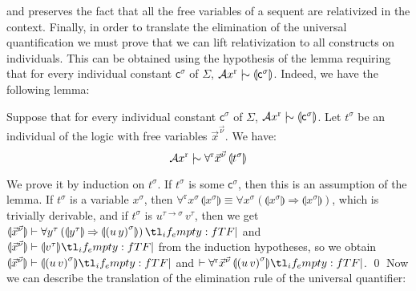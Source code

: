 \documentclass{CSML}
\newcommand*\ifpresent[3]{\tl_if_empty:fTF{#1}{#3}{#2}}
\newcommand*\Entails{\mathrel{\vdash}}
\newcommand*\Derives{\mathrel{|\mkern-8.75mu\sim}}
\newcommand*\BarSep{\mathrel{|}}
\newcommand*\Sequent[3]{#1\Entails#2\ifpresent{#3}{\BarSep}{}#3}
\newcommand*\SortTo\to
\newcommand*\SortA{\sigma}
\newcommand*\SortB{\tau}
\newcommand*\SortC{\nu}
\newcommand*\LogSortedTerm[2]{#1^{#2}}
\newcommand*\LogTermA{t}
\newcommand*\LogTermB{u}
\newcommand*\LogTermC{v}
\newcommand*\LogVarA{x}
\newcommand*\LogVarB{y}
\newcommand*\LogConst[1]{\mathsf{#1}}
\newcommand*\LogConstA{\LogConst{c}}
\newcommand*\LogImp{\mathbin{\Rightarrow}}
\newcommand*\LogRel[1]{\llparenthesis#1\rrparenthesis}
\newcommand*\LogRelForm[1]{{#1^\mathrm{r}}}
\newcommand*\LogForallRel{\forall^\mathrm{r}}
\newcommand*\LogAxioms{\mathcal{A}x}
\begin{document}
and preserves the fact that all the free variables of a sequent are relativized in the context. Finally, in order to translate the elimination of the universal quantification we must prove that we can lift relativization to all constructs on individuals. This can be obtained using the hypothesis of the lemma requiring that for every individual constant $\LogSortedTerm{\LogConstA}{\SortA}$ of $\Sigma$, $\LogRelForm{\LogAxioms}\Derives\LogRel{\LogSortedTerm{\LogConstA}{\SortA}}$. Indeed, we have the following lemma:
\begin{lem}
\label{relindiv}
Suppose that for every individual constant $\LogSortedTerm{\LogConstA}{\SortA}$ of $\Sigma$, $\LogRelForm{\LogAxioms}\Derives\LogRel{\LogSortedTerm{\LogConstA}{\SortA}}$. Let $\LogSortedTerm{\LogTermA}{\SortA}$ be an individual of the logic with free variables $\LogSortedTerm{\vec{\LogVarA}}{\vec{\SortC}}$. We have:
$$\LogRelForm{\LogAxioms}\Derives\LogForallRel\LogSortedTerm{\vec{\LogVarA}}{\vec{\SortC}}\,\LogRel{\LogSortedTerm{\LogTermA}{\SortA}}$$
\end{lem}
\proof
We prove it by induction on $\LogSortedTerm{\LogTermA}{\SortA}$. If $\LogSortedTerm{\LogTermA}{\SortA}$ is some $\LogSortedTerm{\LogConstA}{\SortA}$, then this is an assumption of the lemma. If $\LogSortedTerm{\LogTermA}{\SortA}$ is a variable $\LogSortedTerm{\LogVarA}{\SortA}$, then $\LogForallRel\LogSortedTerm{\LogVarA}{\SortA}\,\LogRel{\LogSortedTerm{\LogVarA}{\SortA}}\equiv\forall\LogSortedTerm{\LogVarA}{\SortA}\left(\LogRel{\LogSortedTerm{\LogVarA}{\SortA}}\LogImp\LogRel{\LogSortedTerm{\LogVarA}{\SortA}}\right)$, which is trivially derivable, and if $\LogSortedTerm{\LogTermA}{\SortA}$ is $\LogSortedTerm{\LogTermB}{\SortB\SortTo\SortA}\,\LogSortedTerm{\LogTermC}{\SortB}$, then we get $\Sequent{\LogRel{\LogSortedTerm{\vec{\LogVarA}}{\vec{\SortC}}}}{\forall\LogSortedTerm{\LogVarB}{\SortB}\left(\LogRel{\LogSortedTerm{\LogVarB}{\SortB}}\LogImp\LogRel{\LogSortedTerm{\left(\LogTermB\,\LogVarB\right)}{\SortA}}\right)}{}$ and $\Sequent{\LogRel{\LogSortedTerm{\vec{\LogVarA}}{\vec{\SortC}}}}{\LogRel{\LogSortedTerm{\LogTermC}{\SortB}}}{}$ from the induction hypotheses, so we obtain $\Sequent{\LogRel{\LogSortedTerm{\vec{\LogVarA}}{\vec{\SortC}}}}{\LogRel{\LogSortedTerm{\left(\LogTermB\,\LogTermC\right)}{\SortA}}}{}$ and $\Sequent{}{\LogForallRel\LogSortedTerm{\vec{\LogVarA}}{\vec{\SortC}}\,\LogRel{\LogSortedTerm{\left(\LogTermB\,\LogTermC\right)}{\SortA}}}{}$.
\qed
Now we can describe the translation of the elimination rule of the universal quantifier:
\end{document}
